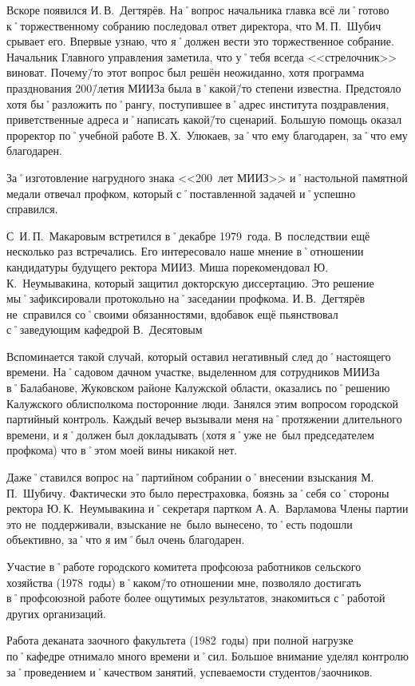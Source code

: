 Вскоре появился И.\,В.~Дегтярёв. На˚вопрос начальника главка всё ли˚готово к˚торжественному собранию последовал ответ директора, что М.\,П.~Шубич срывает его. Впервые узнаю, что я˚должен вести это торжественное собрание. Начальник Главного управления заметила, что у˚тебя всегда <<стрелочник>> виноват. Почему\=/то этот вопрос был решён неожиданно, хотя программа празднования 200\=/летия МИИЗа была в˚какой\=/то степени известна. Предстояло хотя бы˚разложить по˚рангу, поступившее в˚адрес института поздравления, приветственные адреса и˚написать какой\=/то сценарий. Большую помощь оказал проректор по˚учебной работе В.\,Х.~Улюкаев, за˚что ему благодарен, за˚что ему благодарен.

За˚изготовление нагрудного знака <<200~лет МИИЗ>> и˚настольной памятной медали отвечал профком, который с˚поставленной задачей и˚успешно справился.

С~И.\,П.~Макаровым встретился в˚декабре 1979~года. В~последствии ещё несколько раз встречались. Его интересовало наше мнение в˚отношении кандидатуры будущего ректора МИИЗ. Миша порекомендовал Ю.\,К.~Неумывакина, который защитил докторскую диссертацию. Это решение мы˚зафиксировали протокольно на˚заседании профкома. И.\,В.~Дегтярёв не~справился со˚своими обязанностями, вдобавок ещё пьянствовал с˚заведующим кафедрой В.~Десятовым

Вспоминается такой случай, который оставил негативный след до˚настоящего времени. На˚садовом дачном участке, выделенном для сотрудников МИИЗа в˚Балабанове, Жуковском районе Калужской области, оказались по˚решению Калужского облисполкома посторонние люди. Занялся этим вопросом городской партийный контроль. Каждый вечер вызывали меня на˚протяжении длительного времени, и я˚должен был докладывать (хотя я˚уже не~был председателем профкома) что в˚этом моей вины никакой нет.

Даже˚ставился вопрос на˚партийном собрании о˚внесении взыскания М.\,П.~Шубичу. Фактически это было перестраховка, боязнь за˚себя со˚стороны ректора Ю.\,К.~Неумывакина и˚секретаря партком А.\,А.~Варламова Члены партии это не~поддерживали, взыскание не~было вынесено, то˚есть подошли объективно, за˚что я им˚был очень благодарен.

Участие в˚работе городского комитета профсоюза работников сельского хозяйства (1978~годы) в˚каком\=/то отношении мне, позволяло достигать в˚профсоюзной работе более ощутимых результатов, знакомиться с˚работой других организаций.

Работа деканата заочного факультета (1982~годы) при полной нагрузке по˚кафедре отнимало много времени и˚сил. Большое внимание уделял контролю за˚проведением и˚качеством занятий, успеваемости студентов\-/заочников.

